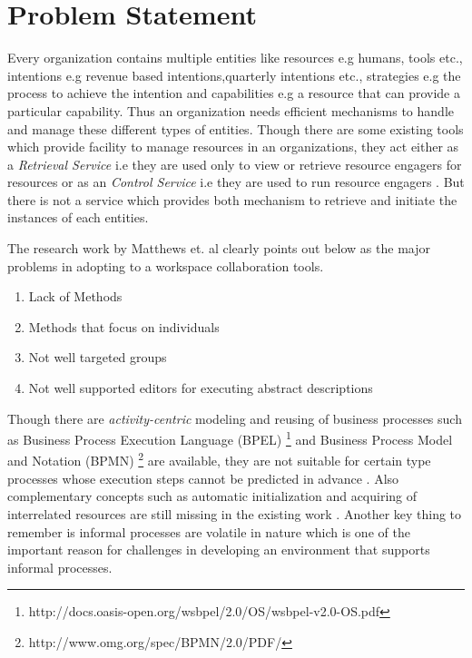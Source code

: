 \section{Problem Statement}
\label{sec:problemstatement}
 Every organization contains multiple entities like resources e.g humans, tools etc., intentions e.g revenue based intentions,quarterly intentions etc., strategies e.g the process to achieve the intention and capabilities e.g a resource that can provide a particular capability. Thus an organization needs efficient mechanisms to handle and manage these different types of entities. Though there are some existing tools which provide facility to manage resources in an organizations, they act either as a \textit{Retrieval Service} i.e they are used only to view or retrieve resource engagers for resources or as an \textit{Control Service} i.e they are used to run resource engagers \cite{Sungur2015}. But there is not a service which provides both mechanism to retrieve and initiate the instances of each entities.
 
  The research work by Matthews et. al \cite{Matthews2011}  clearly points out below as the major problems in adopting to a workspace collaboration tools.

\begin{enumerate}
	\item Lack of Methods
	\item Methods that focus on individuals
	\item Not well targeted groups
	\item Not well supported editors for executing abstract descriptions
\end{enumerate}

Though there are \textit{activity-centric} modeling and reusing of business processes such as Business Process Execution Language (BPEL) \footnote{http://docs.oasis-open.org/wsbpel/2.0/OS/wsbpel-v2.0-OS.pdf} and Business Process Model and Notation (BPMN) \footnote{http://www.omg.org/spec/BPMN/2.0/PDF/} are available, they are not suitable for certain type processes whose execution steps cannot be predicted in advance \cite{Sungur2014a}. Also complementary concepts such as automatic initialization and acquiring of interrelated resources are still missing in the existing work \cite{Sungur2015}. Another key thing to remember is informal processes are volatile in nature which is one of the important reason for challenges in developing an environment that supports informal processes.

